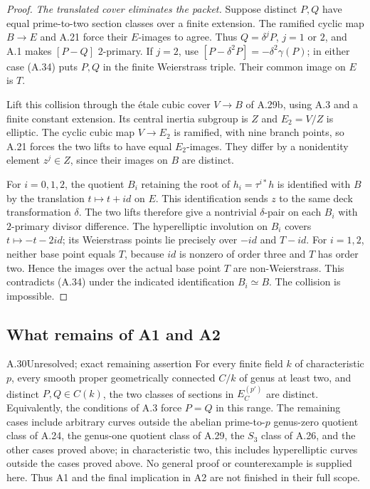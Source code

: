 \begin{proof}
\emph{The translated cover eliminates the packet.}
Suppose distinct $P,Q$ have equal prime-to-two section
classes over a finite extension. The ramified cyclic
map $B\to E$ and A.21 force their $E$-images to agree.
Thus $Q=\delta^jP$, $j=1$ or $2$, and A.1 makes
$[P-Q]$ $2$-primary. If $j=2$, use
$[P-\delta^2P]=-\delta^2\gamma(P)$; in either case
(A.34) puts $P,Q$ in the finite Weierstrass triple.
Their common image on $E$ is $T$.

Lift this collision through the \'etale cubic cover
$V\to B$ of A.29b, using A.3 and a finite constant
extension. Its central inertia subgroup is $Z$ and
$E_2=V/Z$ is elliptic. The cyclic cubic map
$V\to E_2$ is ramified, with nine branch points, so
A.21 forces the two lifts to have equal $E_2$-images.
They differ by a nonidentity element $z^j\in Z$,
since their images on $B$ are distinct.

For $i=0,1,2$, the quotient $B_i$ retaining the root
of $h_i=\tau^{i*}h$ is identified with $B$ by the
translation $t\mapsto t+id$ on $E$. This identification
sends $z$ to the same deck transformation $\delta$.
The two lifts therefore give a nontrivial $\delta$-pair
on each $B_i$ with $2$-primary divisor difference.
The hyperelliptic involution on $B_i$ covers
$t\mapsto-t-2id$; its Weierstrass points lie precisely
over $-id$ and $T-id$. For $i=1,2$, neither base point
equals $T$, because $id$ is nonzero of order three
and $T$ has order two. Hence the images over the actual
base point $T$ are non-Weierstrass. This contradicts
(A.34) under the indicated identification $B_i\simeq B$.
The collision is impossible.
\end{proof}

\subsection{What remains of A1 and A2}

\begin{claim}{A.30}{Unresolved; exact remaining assertion}
For every finite field $k$ of characteristic $p$, every smooth proper
geometrically connected $C/k$ of genus at least two, and distinct
$P,Q\in C(k)$, the two classes of sections in $E_C^{(p')}$ are
distinct. Equivalently, the conditions of A.3 force $P=Q$ in this
range. The remaining cases include arbitrary curves outside the
abelian prime-to-$p$ genus-zero quotient class of A.24,
the genus-one quotient class of A.29, the
$S_3$ class of A.26, and
the other cases proved above; in characteristic two, this
includes hyperelliptic curves outside
the cases proved above. No general proof or counterexample is
supplied here. Thus A1 and the final implication in A2 are not
finished in their full scope.
\end{claim}

